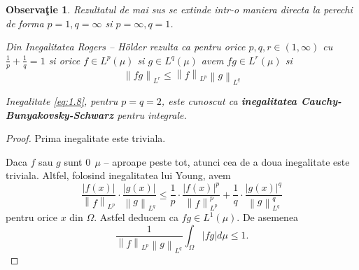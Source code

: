 \documentclass[a4paper,12pt,oneside]{report}
\newtheorem{remark}{Observa\c{t}ie}
\begin{document}
\begin{remark}
	Rezultatul de mai sus se extinde intr-o maniera directa la perechi de forma \(p = 1, q = \infty\) si \(p = \infty, q = 1\).
	
Din Inegalitatea Rogers – Hölder rezulta ca pentru orice \(p, q, r \in \left ( 1 , \infty  \right )\) cu \(\frac{1}{p} + \frac{1}{q} = 1\) si orice \(f\in L^{p}\left ( \mu  \right )\) si \(g\in L^{q}\left ( \mu  \right )\) avem \(fg\in L^{r}\left ( \mu  \right )\) si
\begin{displaymath}
  \left \| fg \right \|_{L^{r}}\leq \left \| f \right \|_{L^{p}}\left \| g \right \|_{L^{q}} \label{eq:1.9} \tag{1.9}
\end{displaymath}


Inegalitate \ref{eq:1.8}, pentru \(p = q = 2\), este cunoscut ca \textbf{inegalitatea Cauchy-Bunyakovsky-Schwarz} pentru integrale.
\end{remark}
\begin{proof}
Prima inegalitate este triviala.

Daca \(f\) sau \(g\) sunt \(0~~ \mu\) – aproape peste tot, atunci cea de a doua inegalitate este triviala. Altfel, folosind inegalitatea lui Young, avem
\begin{displaymath}
  \frac{\left | f\left ( x \right ) \right |}{\left \| f \right \|_{L^{p}}} \cdot \frac{\left | g\left ( x \right ) \right |}{\left \| g \right \|_{L^{q}}}\leq \frac{1}{p}\cdot \frac{\left | f\left ( x \right ) \right |^{p}}{\left \| f \right \|^{p}_{L^{p}}} + \frac{1}{q}\cdot \frac{\left | g\left ( x \right ) \right |^{q}}{\left \| g \right \|^{q}_{L^{q}}}
\end{displaymath}
 pentru orice \(x\) din \(\Omega\). Astfel deducem ca \(fg \in L^{1}\left ( \mu  \right )\). De asemenea
\begin{displaymath}
  \frac{1}{\left \| f \right \|_{L^{p}}\left \| g \right \|_{L^{q}}}\int_{\Omega }\left | fg \right |d\mu \leq 1.
\end{displaymath}
\end{proof}
\end{document}
